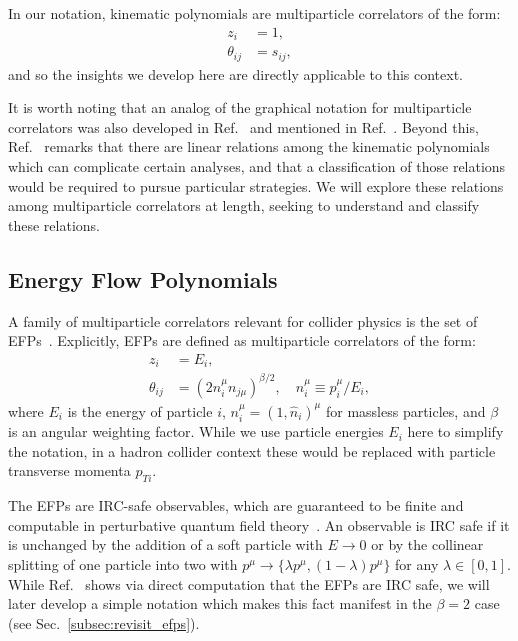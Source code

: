 \documentclass[aps,prd,floatfix,preprintnumbers,twocolumn,groupedaddress,nofootinbib,longbibliography,10pt]{revtex4-1}
\DeclareRobustCommand{\Sec}[1]{Sec.~\ref{#1}}
\DeclareRobustCommand{\Ref}[1]{Ref.~\cite{#1}}
\begin{document}
In our notation, kinematic polynomials are multiparticle correlators of the form:
%
\begin{align}
z_i &=1,\\
\theta_{ij} &= s_{ij},\label{eq:kinpolytheta}
\end{align}
%
and so the insights we develop here are directly applicable to this context.


It is worth noting that an analog of the graphical notation for multiparticle correlators was also developed in \Ref{Hogervorst:2014rta} and mentioned in \Ref{Henning:2017fpj}.
%
Beyond this, \Ref{Hogervorst:2014rta} remarks that there are linear relations among the kinematic polynomials which can complicate certain analyses, and that a classification of those relations would be required to pursue particular strategies.
%
We will explore these relations among multiparticle correlators at length, seeking to understand and classify these relations.


\subsection{Energy Flow Polynomials}
\label{sec:efps}


A family of multiparticle correlators relevant for collider physics is the set of EFPs~\cite{Komiske:2017aww}.
%
Explicitly, EFPs are defined as multiparticle correlators of the form:
%
\begin{align}
z_i &=E_i,\label{eq:efp1}\\
\theta_{ij} &= (2n_i^\mu n_{j\mu})^{\beta/2},\quad n_i^\mu \equiv p_i^\mu/E_i,\label{eq:efp2}
\end{align}
%
where $E_i$ is the energy of particle $i$, $n_i^\mu = (1,\hat n_i)^\mu$ for massless particles, and $\beta$ is an angular weighting factor.
%
While we use particle energies $E_i$ here to simplify the notation, in a hadron collider context these would be replaced with particle transverse momenta $p_{Ti}$.


The EFPs are IRC-safe observables, which are guaranteed to be finite and computable in perturbative quantum field theory~\cite{sterman1995handbook,Weinberg:1995mt,Kinoshita:1962ur,Lee:1964is,Frye:2018xjj}.
%
An observable is IRC safe if it is unchanged by the addition of a soft particle with $E\to0$ or by the collinear splitting of one particle into two with $p^\mu\to \{\lambda p^\mu, (1-\lambda)p^\mu\}$ for any $\lambda \in [0,1]$.
%
While \Ref{Komiske:2017aww} shows via direct computation that the EFPs are IRC safe, we will later develop a simple notation which makes this fact manifest in the $\beta=2$ case (see \Sec{subsec:revisit_efps}).
\end{document}
